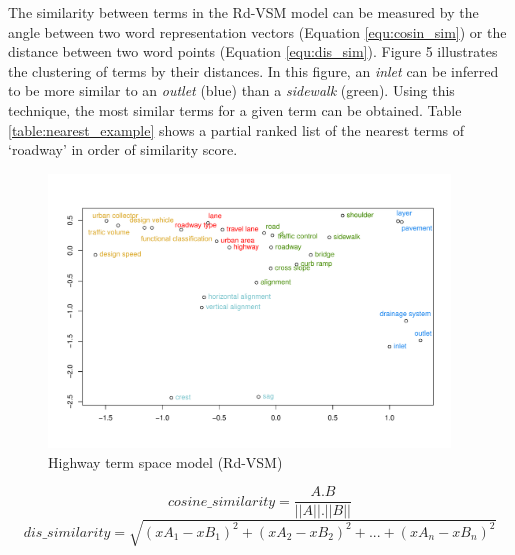 \documentclass[Journal, BackFigs,NoLists, DoubleSpace]{ascelike}%
\begin{document}
\par
The similarity between terms in the Rd-VSM model can be measured by the angle between two word representation vectors (Equation \ref{equ:cosin_sim}) or the distance between two word points (Equation \ref{equ:dis_sim}). Figure 5 illustrates the clustering of terms by their distances. In this figure, an \textit{inlet} can be inferred to be more similar to an \textit{outlet} (blue) than a \textit{sidewalk} (green). Using this technique, the most similar terms for a given term can be obtained. Table \ref{table:nearest_example} shows a partial ranked list of the nearest terms of `roadway' in order of similarity score.
%
\begin{figure}[t]
	\centering
	\includegraphics[width=0.95\textwidth]{Figure5_hvsm_space}
	\caption{Highway term space model (Rd-VSM)}
	\label{fig:hvsm}
\end{figure}
%
\begin{equation}
\label{equ:cosin_sim}
cosine\_similarity = \frac{A.B}{||A||.||B||}
\end{equation}
%
\begin{equation}
\label{equ:dis_sim}
dis\_similarity =\sqrt{(xA_1-xB_1)^2+(xA_2-xB_2)^2+...+(xA_n-xB_n)^2}
\end{equation}
\end{document}
